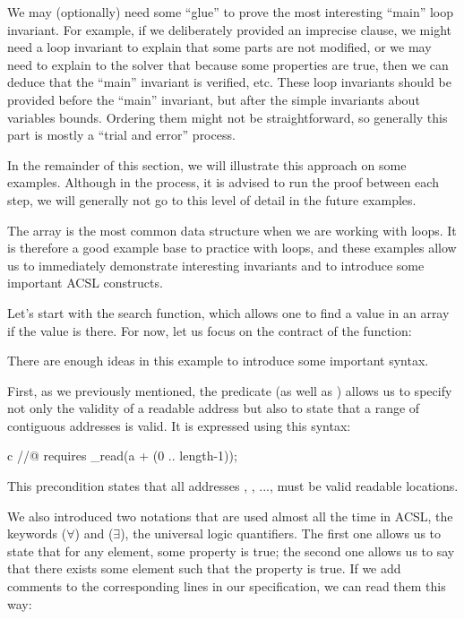 We may (optionally) need some ``glue'' to prove the most interesting ``main''
loop invariant. For example, if we deliberately provided an imprecise
 clause, we might need a loop invariant to explain that
some parts are not modified, or we may need to explain to the solver that
because some properties are true, then we can deduce that the ``main'' invariant
is verified, etc. These loop invariants should be provided before the ``main''
invariant, but after the simple invariants about variables bounds. Ordering them
might not be straightforward, so generally this part is mostly a
``trial and error'' process.


In the remainder of this section, we will illustrate this approach on some
examples. Although in the process, it is advised to run the proof between each
step, we will generally not go to this level of detail in the future examples.


\label{l3:statements-loops-examples-ro}


The array is the most common data structure when we are working with loops.
It is therefore a good example base to practice with loops, and these
examples allow us to immediately demonstrate interesting invariants and
to introduce some important ACSL constructs.


Let's start with the search function, which allows one to find a
value in an array if the value is there. For now, let us focus on the contract of the function:




There are enough ideas in this example to introduce some important syntax.


First, as we previously mentioned, the
 predicate (as well as
) allows us to specify not only the
validity of a readable address but also to state that a range of
contiguous addresses is valid. It is expressed using this syntax:


\begin{CodeBlock}{c}
//@ requires \valid_read(a + (0 .. length-1));
\end{CodeBlock}


This precondition states that all addresses ,
, ...,  must be valid readable
locations.


We also introduced two notations that are used almost all the time in
ACSL, the keywords  ($\forall$) and
 ($\exists$), the universal logic
quantifiers. The first one allows us to state that for any element, some
property is true; the second one allows us to say that there exists some
element such that the property is true. If we add comments to the
corresponding lines in our specification, we can read them this way:


